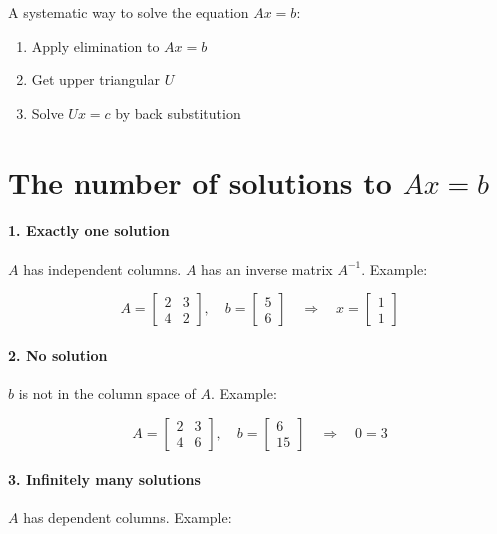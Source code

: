 \noindent A systematic way to solve the equation $Ax=b$:
\begin{enumerate}
    \item Apply elimination to $Ax=b$
    \item Get upper triangular $U$
    \item Solve $Ux=c$ by back substitution
\end{enumerate}

\section{The number of solutions to $Ax=b$}

\paragraph{1. Exactly one solution} $A$ has independent columns. $A$ has an inverse matrix $A^{-1}$. Example:

\[
    A =
    \begin{bmatrix}
        2 & 3 \\
        4 & 2
    \end{bmatrix},
    \quad
    b =
    \begin{bmatrix}
        5 \\ 6
    \end{bmatrix}
    \quad\Rightarrow\quad
    x =
    \begin{bmatrix}
        1 \\ 1
    \end{bmatrix}
\]

\paragraph{2. No solution} $b$ is not in the column space of $A$. Example:

\[
    A =
    \begin{bmatrix}
        2 & 3 \\
        4 & 6
    \end{bmatrix},
    \quad
    b =
    \begin{bmatrix}
        6 \\ 15
    \end{bmatrix}
    \quad\Rightarrow\quad
    0=3
\]

\paragraph{3. Infinitely many solutions} $A$ has dependent columns. Example:

